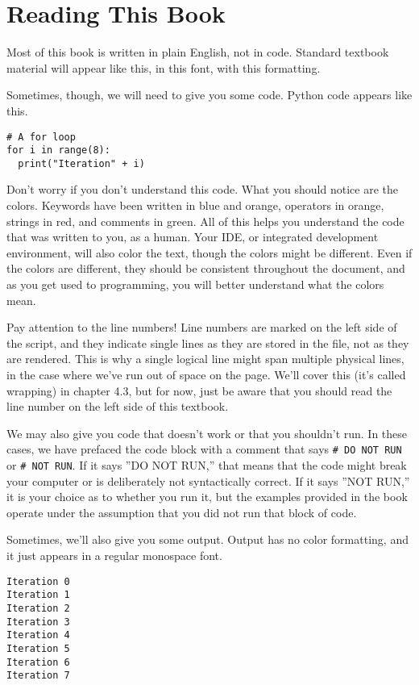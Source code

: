 \section{Reading This Book}
Most of this book is written in plain English, not in code. Standard textbook material will appear like this, in this font, with this formatting.\par
Sometimes, though, we will need to give you some code. Python code appears like this.
\begin{lstlisting}[style=pippython]
# A for loop
for i in range(8):
  print("Iteration" + i)
\end{lstlisting}
Don't worry if you don't understand this code. What you should notice are the colors. Keywords have been written in blue and orange, operators in orange, strings in red, and comments in green. All of this helps you understand the code that was written to you, as a human. Your IDE, or integrated development environment, will also color the text, though the colors might be different. Even if the colors are different, they should be consistent throughout the document, and as you get used to programming, you will better understand what the colors mean.\par
Pay attention to the line numbers! Line numbers are marked on the left side of the script, and they indicate single lines as they are stored in the file, not as they are rendered. This is why a single logical line might span multiple physical lines, in the case where we've run out of space on the page. We'll cover this (it's called wrapping) in chapter 4.3, but for now, just be aware that you should read the line number on the left side of this textbook.\par
We may also give you code that doesn't work or that you shouldn't run. In these cases, we have prefaced the code block with a comment that says \verb|# DO NOT RUN| or \verb|# NOT RUN|. If it says ''DO NOT RUN,'' that means that the code might break your computer or is deliberately not syntactically correct. If it says ''NOT RUN,'' it is your choice as to whether you run it, but the examples provided in the book operate under the assumption that you did not run that block of code.\par
Sometimes, we'll also give you some output. Output has no color formatting, and it just appears in a regular monospace font.
\begin{lstlisting}[style=none]
Iteration 0
Iteration 1
Iteration 2
Iteration 3
Iteration 4
Iteration 5
Iteration 6
Iteration 7
\end{lstlisting}
